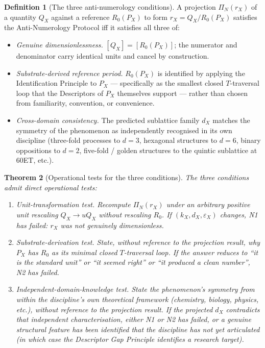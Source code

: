 \documentclass[11pt,a4paper]{article}
\newtheorem{theorem}{Theorem}[section]
\theoremstyle{definition}
\newtheorem{definition}[theorem]{Definition}
\theoremstyle{remark}
\begin{document}
\begin{definition}[The three anti-numerology conditions]\label{def:N1N2N3}
A projection $\Pi_{N}(r_{X})$ of a quantity $Q_{X}$ against a reference $R_{0}(P_{X})$ to form $r_{X} = Q_{X}/R_{0}(P_{X})$ satisfies the Anti-Numerology Protocol iff it satisfies all three of:
\begin{itemize}[leftmargin=*]
\item[\textbf{(N1)}] \emph{Genuine dimensionlessness.} $[Q_{X}] = [R_{0}(P_{X})]$; the numerator and denominator carry identical units and cancel by construction.
\item[\textbf{(N2)}] \emph{Substrate-derived reference period.} $R_{0}(P_{X})$ is identified by applying the Identification Principle to $P_{X}$ --- specifically as the smallest closed $T$-traversal loop that the Descriptors of $P_{X}$ themselves support --- rather than chosen from familiarity, convention, or convenience.
\item[\textbf{(N3)}] \emph{Cross-domain consistency.} The predicted sublattice family $d_{X}$ matches the symmetry of the phenomenon as independently recognised in its own discipline (three-fold processes to $d=3$, hexagonal structures to $d=6$, binary oppositions to $d=2$, five-fold / golden structures to the quintic sublattice at $60$ET, etc.).
\end{itemize}
\end{definition}

\begin{theorem}[Operational tests for the three conditions]\label{thm:N1N2N3}
The three conditions admit direct operational tests:
\begin{enumerate}[leftmargin=*]
\item[\textbf{(N1)}] \emph{Unit-transformation test.} Recompute $\Pi_{N}(r_{X})$ under an arbitrary positive unit rescaling $Q_{X} \to uQ_{X}$ without rescaling $R_{0}$. If $(k_{X}, d_{X}, \varepsilon_{X})$ changes, N1 has failed: $r_{X}$ was not genuinely dimensionless.
\item[\textbf{(N2)}] \emph{Substrate-derivation test.} State, without reference to the projection result, why $P_{X}$ has $R_{0}$ as its minimal closed $T$-traversal loop. If the answer reduces to ``it is the standard unit'' or ``it seemed right'' or ``it produced a clean number'', N2 has failed.
\item[\textbf{(N3)}] \emph{Independent-domain-knowledge test.} State the phenomenon's symmetry from within the discipline's own theoretical framework (chemistry, biology, physics, etc.), without reference to the projection result. If the projected $d_{X}$ contradicts that independent characterisation, either N1 or N2 has failed, or a genuine structural feature has been identified that the discipline has not yet articulated (in which case the Descriptor Gap Principle identifies a research target).
\end{enumerate}
\end{theorem}
\end{document}
